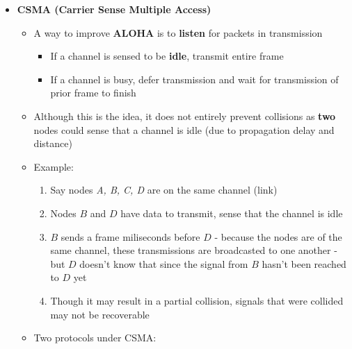 \documentclass{article}
\begin{document}
\begin{itemize}
    \item \textbf{CSMA (Carrier Sense Multiple Access)}
    \begin{itemize}
        \item A way to improve \textbf{ALOHA} is to \textbf{listen} for packets in transmission
        \begin{itemize}
            \item If a channel is sensed to be \textbf{idle}, transmit entire frame
            \item If a channel is busy, defer transmission and wait for transmission of
            prior frame to finish
        \end{itemize}
        \item Although this is the idea, it does not entirely prevent collisions as \textbf{two}
        nodes could sense that a channel is idle (due to propagation delay and distance)
        \item Example:
        \begin{enumerate}
            \item Say nodes \textit{A, B, C, D} are on the same channel (link)
            \item Nodes $B$ and $D$ have data to transmit, sense that the channel is idle
            \item $B$ sends a frame miliseconds before $D$ - because the nodes are of the same
            channel, these transmissions are broadcasted to one another - but $D$ doesn't know that
            since the signal from $B$ hasn't been reached to $D$ yet
            \item Though it may result in a partial collision, signals that were collided may not
            be recoverable
        \end{enumerate}
        \item Two protocols under CSMA:
    \end{itemize}


\end{itemize}
\end{document}
